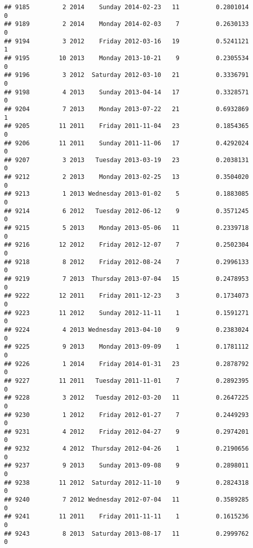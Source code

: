 \documentclass[
]{article}
\begin{document}
\begin{verbatim}
## 9185         2 2014    Sunday 2014-02-23   11          0.2801014             0
## 9189         2 2014    Monday 2014-02-03    7          0.2630133             0
## 9194         3 2012    Friday 2012-03-16   19          0.5241121             1
## 9195        10 2013    Monday 2013-10-21    9          0.2305534             0
## 9196         3 2012  Saturday 2012-03-10   21          0.3336791             0
## 9198         4 2013    Sunday 2013-04-14   17          0.3328571             0
## 9204         7 2013    Monday 2013-07-22   21          0.6932869             1
## 9205        11 2011    Friday 2011-11-04   23          0.1854365             0
## 9206        11 2011    Sunday 2011-11-06   17          0.4292024             0
## 9207         3 2013   Tuesday 2013-03-19   23          0.2038131             0
## 9212         2 2013    Monday 2013-02-25   13          0.3504020             0
## 9213         1 2013 Wednesday 2013-01-02    5          0.1883085             0
## 9214         6 2012   Tuesday 2012-06-12    9          0.3571245             0
## 9215         5 2013    Monday 2013-05-06   11          0.2339718             0
## 9216        12 2012    Friday 2012-12-07    7          0.2502304             0
## 9218         8 2012    Friday 2012-08-24    7          0.2996133             0
## 9219         7 2013  Thursday 2013-07-04   15          0.2478953             0
## 9222        12 2011    Friday 2011-12-23    3          0.1734073             0
## 9223        11 2012    Sunday 2012-11-11    1          0.1591271             0
## 9224         4 2013 Wednesday 2013-04-10    9          0.2383024             0
## 9225         9 2013    Monday 2013-09-09    1          0.1781112             0
## 9226         1 2014    Friday 2014-01-31   23          0.2878792             0
## 9227        11 2011   Tuesday 2011-11-01    7          0.2892395             0
## 9228         3 2012   Tuesday 2012-03-20   11          0.2647225             0
## 9230         1 2012    Friday 2012-01-27    7          0.2449293             0
## 9231         4 2012    Friday 2012-04-27    9          0.2974201             0
## 9232         4 2012  Thursday 2012-04-26    1          0.2190656             0
## 9237         9 2013    Sunday 2013-09-08    9          0.2898011             0
## 9238        11 2012  Saturday 2012-11-10    9          0.2824318             0
## 9240         7 2012 Wednesday 2012-07-04   11          0.3589285             0
## 9241        11 2011    Friday 2011-11-11    1          0.1615236             0
## 9243         8 2013  Saturday 2013-08-17   11          0.2999762             0

\end{verbatim}
\end{document}
